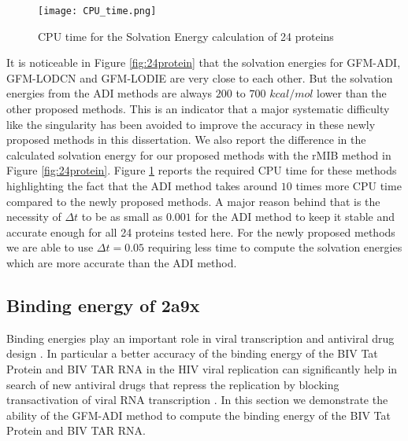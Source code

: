 \begin{figure}[t!]
	\begin{center}
		\texttt{[image: CPU\_time.png]}
	\end{center}
	\caption{CPU time for the Solvation Energy calculation of 24 proteins}
	\label{fig:CPU_24protein}
\end{figure}
It is noticeable in Figure \ref{fig:24protein} that the solvation energies for GFM-ADI, GFM-LODCN and GFM-LODIE are very close to each other. But the solvation energies from the ADI methods are always $200$ to $700$ $kcal/mol$ lower than the other proposed methods. This is an indicator that a major systematic difficulty like the singularity has been avoided to improve the accuracy in these newly proposed methods in this dissertation. We  also report the difference in the calculated solvation energy for our proposed methods with the rMIB method in Figure \ref{fig:24protein}. Figure \ref{fig:CPU_24protein} reports the required CPU time for these methods highlighting the fact that the ADI method takes around $10$ times more CPU time compared to the newly proposed methods. A major reason behind that is the necessity of $\Delta t$ to be as small as $0.001$ for the ADI method to keep it stable and accurate enough for all 24 proteins tested here. For the newly proposed methods we are able to use $\Delta t =0.05$ requiring less time to compute the solvation energies which are more accurate than the ADI method.    

\subsection{Binding energy of 2a9x}
Binding energies play an important role in viral transcription and antiviral drug design \cite{drug2}. In particular a better accuracy of the binding energy of the BIV Tat Protein and BIV TAR RNA in the HIV viral replication can significantly help in search of new antiviral drugs that repress the replication by blocking transactivation of viral RNA transcription \cite{Leeper2005}. In this section we demonstrate the ability of the GFM-ADI method to compute the binding energy of the BIV Tat Protein and BIV TAR RNA. 

